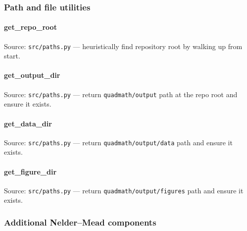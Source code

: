 \documentclass[
  10pt,
]{article}
\newcommand{\passthrough}[1]{#1}
\renewcommand{\texttt}[1]{%
    \colorbox{codebg}{\color{codefg}\ttfamily #1}%
}
\begin{document}
\hypertarget{code:utilities}{%
\subsubsection{Path and file utilities}\label{code:utilities}}

\hypertarget{code:get_repo_root}{%
\paragraph{\texorpdfstring{\texttt{get\_repo\_root}}{get\_repo\_root}}\label{code:get_repo_root}}

Source: \passthrough{\lstinline!src/paths.py!} --- heuristically find
repository root by walking up from start.

\hypertarget{code:get_output_dir}{%
\paragraph{\texorpdfstring{\texttt{get\_output\_dir}}{get\_output\_dir}}\label{code:get_output_dir}}

Source: \passthrough{\lstinline!src/paths.py!} --- return
\passthrough{\lstinline!quadmath/output!} path at the repo root and
ensure it exists.

\hypertarget{code:get_data_dir}{%
\paragraph{\texorpdfstring{\texttt{get\_data\_dir}}{get\_data\_dir}}\label{code:get_data_dir}}

Source: \passthrough{\lstinline!src/paths.py!} --- return
\passthrough{\lstinline!quadmath/output/data!} path and ensure it
exists.

\hypertarget{code:get_figure_dir}{%
\paragraph{\texorpdfstring{\texttt{get\_figure\_dir}}{get\_figure\_dir}}\label{code:get_figure_dir}}

Source: \passthrough{\lstinline!src/paths.py!} --- return
\passthrough{\lstinline!quadmath/output/figures!} path and ensure it
exists.

\hypertarget{code:nelder_mead_components}{%
\subsubsection{Additional Nelder--Mead
components}\label{code:nelder_mead_components}}
\end{document}
